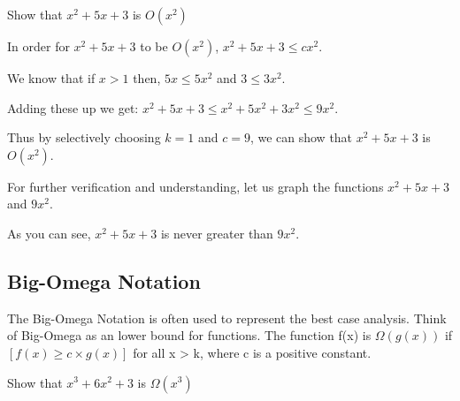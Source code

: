 \begin{example}
    Show that $x^{2} + 5x + 3$ is $O(x^{2})$
\end{example}

\begin{solution}
    In order for $x^{2} + 5x + 3$ to be $O(x^{2})$, $x^{2} + 5x + 3 \leq
    cx^{2}$.

    We know that if $x > 1$ then, $5x \leq 5x^{2}$ and $3 \leq 3x^{2}$.

    Adding these up we get: $x^{2} + 5x + 3 \leq x^{2} + 5x^{2} + 3x^{2} \leq
    9x^{2}$.

    Thus by selectively choosing $k = 1$ and $c = 9$, we can show that $x^{2} +
    5x + 3$ is $O(x^{2})$.

    For further verification and understanding, let us graph the functions
    $x^{2} + 5x + 3$ and $9x^{2}$.


    As you can see, $x^2 + 5x + 3$ is never greater than $9x^{2}$.
\end{solution}

\subsection{Big-Omega Notation}
The Big-Omega Notation is often used to represent the best case analysis. Think
of Big-Omega as an lower bound for functions. The function f(x) is
$\Omega(g(x))$ if $[f(x) \geq c \times g(x)]$ for all x > k, where c is a
positive constant.

\begin{example}
    Show that $x^{3} + 6x^{2} + 3$ is $\Omega(x^{3})$
\end{example}

